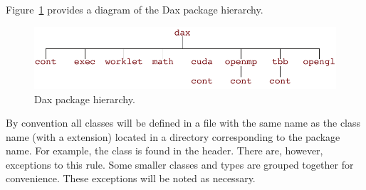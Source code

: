 Figure~\ref{fig:Packages} provides a diagram of the Dax package hierarchy.

\begin{figure}
  \centering
  \includegraphics{images/PackageHierarchy}
  \caption{Dax package hierarchy.}
  \label{fig:Packages}
\end{figure}

By convention all classes will be defined in a file with the same name as
the class name (with a  extension) located in a directory
corresponding to the package name. For example, the 
class is found in the  header. There
are, however, exceptions to this rule. Some smaller classes and types are
grouped together for convenience. These exceptions will be noted as
necessary.

